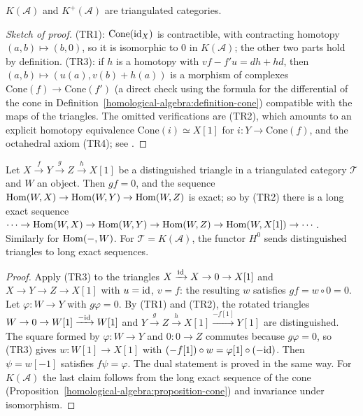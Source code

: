 \begin{theorem}\label{derived-categories:theorem-homotopy-triangulated}
$K(\mathcal{A})$ and $K^+(\mathcal{A})$ are triangulated categories.
\end{theorem}

\begin{proof}[Sketch of proof]
(TR1): $\mathrm{Cone}(\mathrm{id}_X)$ is contractible, with contracting homotopy $(a, b) \mapsto (b, 0)$, so it is isomorphic to $0$ in
$K(\mathcal{A})$; the other two parts hold by definition. (TR3): if $h$ is a homotopy with $vf - f'u = dh + hd$, then
$(a, b) \mapsto (u(a), v(b) + h(a))$ is a morphism of complexes $\mathrm{Cone}(f) \to \mathrm{Cone}(f')$ (a direct check using the formula for
the differential of the cone in Definition~\ref{homological-algebra:definition-cone}) compatible with the maps of the triangles. The
omitted verifications are (TR2), which amounts to an explicit homotopy equivalence $\mathrm{Cone}(i) \simeq X[1]$ for
$i \colon Y \to \mathrm{Cone}(f)$, and the octahedral axiom (TR4); see \cite[Sections 10.1--10.2]{weibel-homological}.
\end{proof}

\begin{proposition}\label{derived-categories:proposition-cohomological}
Let $X \xrightarrow{f} Y \xrightarrow{g} Z \xrightarrow{h} X[1]$ be a distinguished triangle in a triangulated category $\mathcal{T}$ and $W$ an
object. Then $gf = 0$, and the sequence $\operatorname{Hom}(W, X) \to \operatorname{Hom}(W, Y) \to \operatorname{Hom}(W, Z)$ is exact; so by (TR2) there is a long exact
sequence $\cdots \to \operatorname{Hom}(W, X) \to \operatorname{Hom}(W, Y) \to \operatorname{Hom}(W, Z) \to \operatorname{Hom}(W, X[1]) \to \cdots$. Similarly for $\operatorname{Hom}(-, W)$. For
$\mathcal{T} = K(\mathcal{A})$, the functor $H^0$ sends distinguished triangles to long exact sequences.
\end{proposition}

\begin{proof}
Apply (TR3) to the triangles $X \xrightarrow{\mathrm{id}} X \to 0 \to X[1]$ and $X \to Y \to Z \to X[1]$ with $u = \mathrm{id}$, $v = f$: the resulting $w$
satisfies $gf = w \circ 0 = 0$. Let $\varphi \colon W \to Y$ with $g\varphi = 0$. By (TR1) and (TR2), the rotated triangles
$W \to 0 \to W[1] \xrightarrow{-\mathrm{id}} W[1]$ and $Y \xrightarrow{g} Z \xrightarrow{h} X[1] \xrightarrow{-f[1]} Y[1]$ are distinguished. The square formed by
$\varphi \colon W \to Y$ and $0 \colon 0 \to Z$ commutes because $g\varphi = 0$, so (TR3) gives $w \colon W[1] \to X[1]$ with
$(-f[1]) \circ w = \varphi[1] \circ (-\mathrm{id})$. Then $\psi = w[-1]$ satisfies $f\psi = \varphi$. The dual statement is proved in the same way. For $K(\mathcal{A})$ the last claim
follows from the long exact sequence of the cone (Proposition~\ref{homological-algebra:proposition-cone}) and invariance under
isomorphism.
\end{proof}

